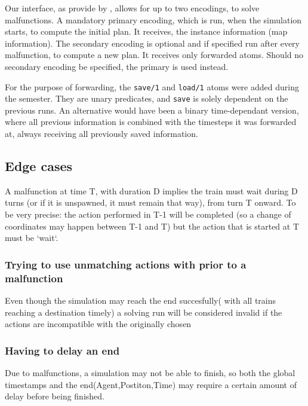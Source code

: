 Our interface, as provide by \cite{flatland}, allows for up to two encodings, to solve malfunctions. A mandatory primary encoding, which is run, when the simulation starts, to compute the initial plan. It receives, the instance information (map information). The secondary encoding is optional and if specified run after every malfunction, to compute a new plan. It receives only forwarded atoms. Should no secondary encoding be specified, the primary is used instead.

For the purpose of forwarding, the \texttt{save/1} and \texttt{load/1} atoms were added during the semester.\cite{malfunction_branch} They are unary predicates, and \texttt{save} is solely dependent on the previous runs. An alternative would have been a binary time-dependant version, where all previous information is combined with the timesteps it was forwarded at, always receiving all previously saved information.

\subsection{Edge cases}
A malfunction at time T, with duration D implies the train must wait during D turns (or if it is unspawned, it must remain that way), from turn T onward. To be very precise: the action performed in T-1 will be completed (so a change of coordinates may happen between T-1 and T) but the action that is started at T must be `wait`.

\subsubsection {Trying to use unmatching actions with prior to a malfunction} Even though the simulation may reach the end succesfully( with all trains reaching a destination timely) a solving run will be considered invalid if the actions are incompatible with the originally chosen

\subsubsection {Having to delay an end} Due to malfunctions, a simulation may not be able to finish, so both the global timestamps and the end(Agent,Postiton,Time) may require a certain amount of delay before being finished.

